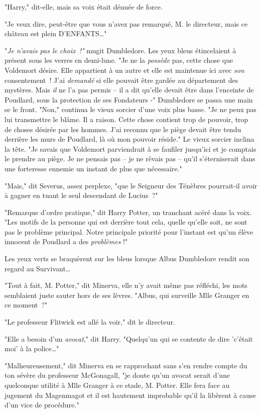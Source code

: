 "Harry," dit-elle, mais sa voix était dénuée de force.

"Je veux dire, peut-être que vous n'avez pas remarqué, M. le directeur, mais ce château est plein D'ENFANTS…"

"\emph{Je n'avais pas le choix~!"} mugit Dumbledore. Les yeux bleus étincelaient à présent sous les verres en demi-lune. "Je ne la \emph{possède} pas, cette chose que Voldemort désire. Elle appartient à un autre et elle est maintenue ici avec \emph{son} consentement~! J'ai \emph{demandé} si elle pouvait être gardée au département des mystères. Mais \emph{il} ne l'a pas permis -- il a dit qu'elle devait être dans l'enceinte de Poudlard, sous la protection de ses Fondateurs -" Dumbledore se passa une main se le front. "Non," continua le vieux sorcier d'une voix plus basse. "Je ne peux pas lui transmettre le blâme. Il a raison. Cette chose contient trop de pouvoir, trop de choses désirée par les hommes. J'ai reconnu que le piège devait être tendu derrière les murs de Poudlard, là où mon pouvoir réside." Le vieux sorcier inclina la tête. "Je savais que Voldemort parviendrait à se faufiler jusqu'ici et je comptais le prendre au piège. Je ne pensais pas -- je ne rêvais pas -- qu'il s'éterniserait dans une forteresse ennemie un instant de plus que nécessaire."

"Mais," dit Severus, assez perplexe, "que le Seigneur des Ténèbres pourrait-il avoir à gagner en tuant le seul descendant de Lucius~?"

"Remarque d'ordre pratique," dit Harry Potter, un tranchant acéré dans la voix. "Les motifs de la personne qui est derrière tout cela, quelle qu'elle soit, ne sont pas le problème principal. Notre principale priorité pour l'instant est qu'un élève innocent de Poudlard a des \emph{problèmes} !"

Les yeux verts se braquèrent sur les bleus lorsque Albus Dumbledore rendit son regard au Survivant…

"Tout à fait, M. Potter," dit Minerva, elle n'y avait même pas réfléchi, les mots semblaient juste sauter hors de ses lèvres. "Albus, qui surveille Mlle Granger en ce moment~?"

"Le professeur Flitwick est allé la voir," dit le directeur.

"Elle a besoin d'un \emph{avocat}," dit Harry. "Quelqu'un qui se contente de dire 'c'était moi' à la police…"

"Malheureusement," dit Minerva en se rapprochant sans s'en rendre compte du ton sévère du professeur McGonagall, "je doute qu'un avocat serait d'une quelconque utilité à Mlle Granger à ce stade, M. Potter. Elle fera face au jugement du Magenmagot et il est hautement improbable qu'il la libèrent à cause d'un vice de procédure."

